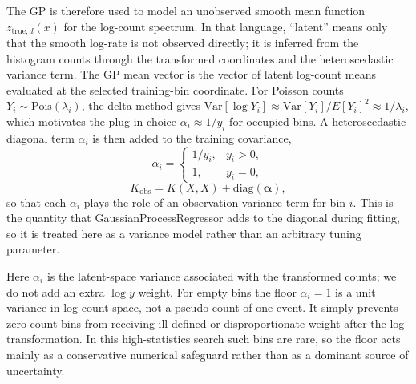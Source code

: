 The GP is therefore used to model an unobserved smooth mean function
$z_{\mathrm{true},d}(x)$ for the log-count spectrum. In that language, ``latent'' means
only that the smooth log-rate is not observed directly; it is inferred from the
histogram counts through the transformed coordinates and the heteroscedastic variance
term. The GP mean vector is the vector of latent log-count means evaluated at the
selected training-bin coordinate. For Poisson counts $Y_i \sim
\mathrm{Pois}(\lambda_i)$, the delta method gives
$\mathrm{Var}[\log Y_i]\approx \mathrm{Var}[Y_i]/E[Y_i]^2 \approx 1/\lambda_i$, which
motivates the plug-in choice $\alpha_i\approx 1/y_i$ for occupied bins. A
heteroscedastic diagonal term $\alpha_i$ is then added to the training covariance,
\begin{equation}
\alpha_i =
\begin{cases}
1/y_i, & y_i > 0, \\
1, & y_i = 0,
\end{cases}
\label{eq:alpha-oney}
\end{equation}
\begin{equation}
K_{\mathrm{obs}} = K(X,X) + \mathrm{diag}(\bm{\alpha}),
\end{equation}
so that each $\alpha_i$ plays the role of an observation-variance term for bin $i$.
This is the quantity that GaussianProcessRegressor adds to the diagonal during fitting,
so it is treated here as a variance model rather than an arbitrary tuning parameter.

Here $\alpha_i$ is the latent-space variance associated with the transformed counts;
we do not add an extra $\log y$ weight. For empty bins the floor
$\alpha_i=1$ is a unit variance in log-count space, not a pseudo-count of one event. It
simply prevents zero-count bins from receiving ill-defined or disproportionate weight
after the log transformation. In this high-statistics search such bins are rare, so the
floor acts mainly as a conservative numerical safeguard rather than as a dominant
source of uncertainty.

